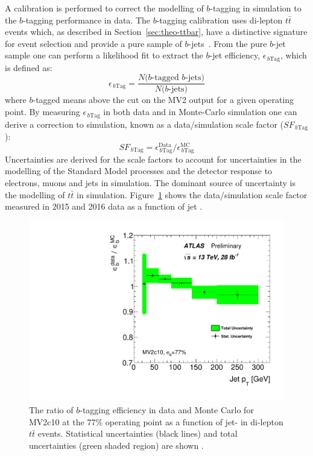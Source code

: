 A calibration is performed to correct the modelling of $b$-tagging in simulation to the $b$-tagging performance in data.
The $b$-tagging calibration uses di-lepton $t\bar{t}$ events which, as described in Section~\ref{sec:theo-ttbar},
have a distinctive signature for event selection and provide a pure sample of $b$-jets~\cite{obj-bjets_calib_tech,obj-bjets_calib_plots}.
From the pure $b$-jet sample one can perform a likelihood fit to extract the $b$-jet efficiency, $\epsilon_{\,b\text{Tag}}$, which is defined as:
\begin{equation}
 \epsilon_{\,b\text{Tag}} = \frac{N(\text{$b$-tagged $b$-jets)}}{N(\text{$b$-jets)}}
\end{equation}
where $b$-tagged means above the cut on the MV2 output for a given operating point.
By measuring $\epsilon_{\,b\text{Tag}}$ in both data and in Monte-Carlo simulation one can derive
a correction to simulation, known as a data/simulation scale factor ($SF_{\,b\text{Tag}}$):
\begin{equation}
 SF_{\,b\text{Tag}} = \epsilon_{\,b\text{Tag}}^{\text{Data}}/\epsilon_{\,b\text{Tag}}^{\text{MC}}
\end{equation}
Uncertainties are derived for the scale factors 
to account for uncertainties in the modelling of the Standard Model processes and the detector response to electrons, muons and jets in simulation.
The dominant source of uncertainty is the modelling of $t\bar{t}$ in simulation.
Figure~\ref{fig:obj-bjets_calib} shows the data/simulation scale factor measured in 2015 and 2016 data as a function of jet \pT{}.

\begin{figure}[!ht]
  \begin{center}
    \includegraphics[width=0.57\linewidth, angle=0]{figs/Objects/bjets_calib_pt.pdf} 
  \end{center}
  \vspace{-1em}
  \caption[The ratio of $b$-tagging efficiency in data and simulation for MV2c10 at the 77\% operating point as a function of jet-\pT{} in di-lepton $t\bar{t}$ events.]
          {\label{fig:obj-bjets_calib}The ratio of $b$-tagging efficiency in data and Monte Carlo for MV2c10 at the 77\% operating point as a function of jet-\pT{}
  in di-lepton $t\bar{t}$ events. Statistical uncertainties (black lines) and total uncertainties (green shaded region) are shown \cite{obj-bjets_calib_plots}.}
\end{figure}

